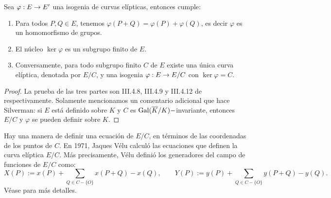 \documentclass[../../tesis_maestria]{subfiles}
\begin{document}
\begin{thm}\label{thm:kernel-isogenias}
	Sea $\varphi: E\rightarrow E'$ una isogenia de curvas elípticas, entonces cumple:
	\begin{enumerate}[label=\roman*)]
		\item Para todos $P,Q\in E$, tenemos $\varphi(P+Q)=\varphi(P)+\varphi(Q)$, es decir $\varphi$ es un homomorfismo de grupos.
		\item\label{inc:nucleo-finito} El núcleo $\ker\varphi$ es un subgrupo finito de $E$.
		\item Conversamente, para todo subgrupo finito $C$ de $E$ existe una única curva elíptica, denotada por $E/C$, y una isogenia $\varphi :E\rightarrow E/C$ con $\ker\varphi =C$. 
	\end{enumerate}
\end{thm}
\begin{proof}
	La  prueba de las tres partes son III.4.8, III.4.9 y III.4.12 de \cite{SilvermanTAOEC} respectivamente. Solamente mencionamos un comentario adicional que hace Silverman: si $E$ está definido sobre $K$ y $C$ es $\mathrm{Gal}(\overline{K}/K)-$invariante, entonces $E/C$ y $\varphi$ se pueden definir sobre $K$.
\end{proof}

\begin{nota}
	Hay una manera de definir una ecuación de $E/C$, en términos de las coordenadas de los puntos de $C$. En 1971, Jaques Vélu calculó las ecuaciones que definen la curva elíptica $E/C$. Más precisamente, Vélu definió los generadores del campo de funciones de $E/C$ como:
	\[
		X(P):=x(P)+\sum_{Q\in C-\{O\}} x(P+Q)-x(Q),\qquad Y(P):=y(P)+\sum_{Q\in C-\{O\}} y(P+Q)-y(Q).
	\]
Véase \cite{VeluIECE} para más detalles.

\end{nota}
\end{document}
